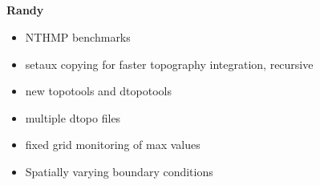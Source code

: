 %
%
%

\subsection{\geoclaw} \textbf{Randy}
\begin{itemize}
    \item NTHMP benchmarks
    \item setaux copying for faster topography integration, recursive 
    \item new topotools and dtopotools
    \item multiple dtopo files
    \item fixed grid monitoring of max values
    \item Spatially varying boundary conditions
\end{itemize}